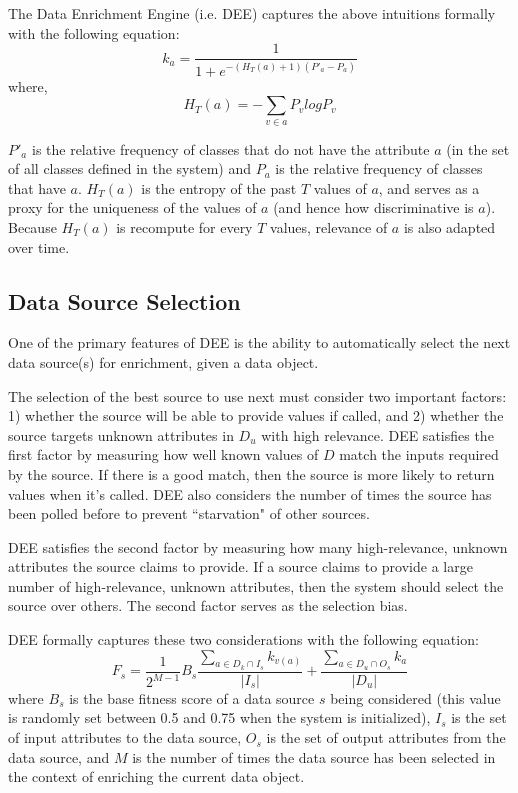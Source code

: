 The Data Enrichment Engine (i.e. DEE) captures the above intuitions formally with the following equation:
\begin{equation}
k_a= \frac{1}{1+ e^{-(H_{T}(a) +1)(P'_a - P_a)}}
\end{equation}
where, 
\begin{equation}
H_{T}(a)= - \displaystyle\sum\limits_{v \in a} P_v log P_v
\end{equation}

$P'_a$ is the relative frequency of classes that do not have the attribute $a$ (in the set of all classes 
defined in the system) and $P_a$ is the relative frequency of classes that have $a$. $H_{T}(a)$ is the entropy 
of the past $T$ values of $a$, and serves as a proxy for the uniqueness of the values of $a$ (and hence how 
discriminative is $a$). Because $H_{T}(a)$ is recompute for every $T$ values, relevance of $a$ is also adapted
over time.


\subsection{Data Source Selection} 

One of the primary features of DEE is the ability to automatically select the next data source(s) for 
enrichment, given a data object. 

The selection of the best source to use next must consider two important factors: 1) whether the source will 
be able to provide values if called, and 2) whether the source targets unknown attributes in $D_u$ with high 
relevance. DEE satisfies the first factor by measuring how well known values of $D$ match the inputs required 
by the source. If there is a good match, then the source is more likely to return values when it's called. DEE
also considers the number of times the source has been polled before to prevent ``starvation" of other sources. 

DEE satisfies the second factor by measuring how many high-relevance, unknown attributes the source claims 
to provide. If a source claims to provide a large number of high-relevance, unknown attributes, then the 
system should select the source over others. The second factor serves as the selection bias. 

DEE formally captures these two considerations with the following equation:
\begin{equation}
    F_s = \frac{1}{2^{M-1}}B_s \frac{\displaystyle\sum\limits_{a \in D_k \cap I_s} k_{v(a)}}{|I_s|} 
    	+ \frac{\displaystyle\sum\limits_{a \in D_u \cap O_s} k_{a}}{|D_u|}
\end{equation}
where $B_s$ is the base fitness score of a data source $s$ being considered (this value is randomly set between 
0.5 and 0.75 when the system is initialized), $I_s$ is the set of input attributes to the data source, $O_s$ is 
the set of output attributes from the data source, and $M$ is the number of times the data source has been 
selected in the context of enriching the current data object.

